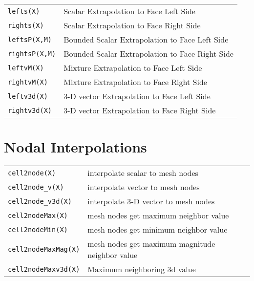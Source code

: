 \begin{center}
\begin{tabular}[h]{|l|l|}
\hline
{\tt lefts(X)} & Scalar Extrapolation to Face Left Side \\
{\tt rights(X)} & Scalar Extrapolation to Face Right Side \\
{\tt leftsP(X,M)} & Bounded Scalar Extrapolation to Face Left Side \\
{\tt rightsP(X,M)} & Bounded Scalar Extrapolation to Face Right Side \\
{\tt leftvM(X)} & Mixture Extrapolation to Face Left Side \\
{\tt rightvM(X)} & Mixture Extrapolation to Face Right Side \\
{\tt leftv3d(X)} & 3-D vector Extrapolation to Face Left Side \\
{\tt rightv3d(X)} & 3-D vector Extrapolation to Face Right Side \\
\hline
\end{tabular}
\end{center}

\section{Nodal Interpolations}

\begin{center}
\begin{tabular}[h]{|l|l|}
\hline
{\tt cell2node(X)} & interpolate scalar to mesh nodes \\
{\tt cell2node\_v(X)} & interpolate vector to mesh nodes \\
{\tt cell2node\_v3d(X)} & interpolate 3-D vector to mesh nodes \\
{\tt cell2nodeMax(X)} & mesh nodes get maximum neighbor value \\
{\tt cell2nodeMin(X)} & mesh nodes get minimum neighbor value \\
{\tt cell2nodeMaxMag(X)} & mesh nodes get maximum magnitude neighbor value \\
{\tt cell2nodeMaxv3d(X)} & Maximum neighboring 3d value \\
\hline
\end{tabular}
\end{center}




